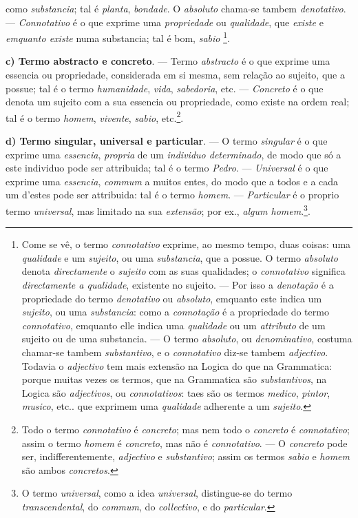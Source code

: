 como \emph{substancia}; tal é \emph{planta}, \emph{bondade}. O \emph{absoluto} chama-se tambem \emph{denotativo}. --- \emph{Connotativo} é o que exprime uma \emph{propriedade} ou \emph{qualidade}, que \emph{existe} e \emph{emquanto existe} numa substancia; tal é bom, \emph{sabio} \footnote{Come se vê, o termo \emph{connotativo} exprime, ao mesmo tempo, duas coisas: uma \emph{qualidade} e um \emph{sujeito}, ou uma \emph{substancia}, que a possue. O termo \emph{absoluto} denota \emph{directamente} o \emph{sujeito} com as suas qualidades; o \emph{connotativo} significa \emph{directamente a qualidade}, existente no sujeito. --- Por isso a \emph{denotação} é a propriedade do termo \emph{denotativo} ou \emph{absoluto}, emquanto este indica um \emph{sujeito}, ou uma \emph{substancia}: como a \emph{connotação} é a propriedade do termo \emph{connotativo}, emquanto elle indica uma \emph{qualidade} ou um \emph{attributo} de um sujeito ou de uma substancia. --- O termo \emph{absoluto}, ou \emph{denominativo}, costuma chamar-se tambem \emph{substantivo}, e o \emph{connotativo} diz-se tambem \emph{adjectivo}. Todavia o \emph{adjectivo} tem mais extensão na Logica do que na Grammatica: porque muitas vezes os termos, que na Grammatica são \emph{substantivos}, na Logica são \emph{adjectivos}, ou \emph{connotativos}: taes são os termos \emph{medico}, \emph{pintor}, \emph{musico}, etc.. que exprimem uma \emph{qualidade} adherente a um \emph{sujeito}.}.

\textbf{c) Termo abstracto e concreto}. --- Termo \emph{abstracto} é o que exprime uma essencia ou propriedade, considerada em si mesma, sem relação ao sujeito, que a possue; tal é o termo \emph{humanidade}, \emph{vida}, \emph{sabedoria}, etc. --- \emph{Concreto} é o que denota um sujeito com a sua essencia ou propriedade, como existe na ordem real; tal é o termo \emph{homem}, \emph{vivente}, \emph{sabio}, etc.\footnote{Todo o termo \emph{connotativo} é \emph{concreto}; mas nem todo o \emph{concreto} é \emph{connotativo}; assim o termo \emph{homem} é \emph{concreto}, mas não é \emph{connotativo}. --- O \emph{concreto} pode ser, indifferentemente, \emph{adjectivo} e \emph{substantivo}; assim os termos \emph{sabio} e \emph{homem} são ambos \emph{concretos}.}.

\textbf{d) Termo singular, universal e particular}. --- O termo \emph{singular} é o que exprime uma \emph{essencia}, \emph{propria} de um \emph{individuo determinado}, de modo que só a este individuo pode ser attribuida; tal é o termo \emph{Pedro}. --- \emph{Universal} é o que exprime uma \emph{essencia}, \emph{commum} a muitos entes, do modo que a todos e a cada um d'estes pode ser attribuida: tal é o termo \emph{homem}. --- \emph{Particular} é o proprio termo \emph{universal}, mas limitado na sua \emph{extensão}; por ex., \emph{algum homem}.\footnote{O termo \emph{universal}, como a idea \emph{universal}, distingue-se do termo \emph{transcendental}, do \emph{commum}, do \emph{collectivo}, e do \emph{particular}.}.

